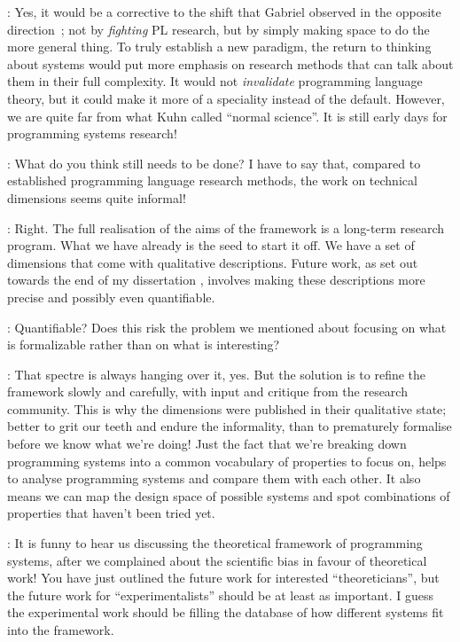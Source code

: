 \documentclass[runningheads]{llncs}
\newcommand{\T}{Tomas}
\newcommand{\J}{Joel}
\newcommand{\says}[2][gg]{\vspace{0.5em}\noindent\hangindent=0.5cm{\textsc{#1}}: #2}
\begin{document}
\says[\J]{Yes, it would be a corrective to the shift that Gabriel observed in the opposite direction\ \cite{rpg-2012-revolution}; not by \emph{fighting} PL research, but by simply making space to do the more general thing. To truly establish a new paradigm, the return to thinking about systems would put more emphasis on research methods that can talk about them in their full complexity. It would not \emph{invalidate} programming language theory, but it could make it more of a speciality instead of the default. However, we are quite far from what Kuhn called ``normal science''. It is still early days for programming systems research!}

\says[\T]{What do you think still needs to be done? I have to say that, compared to established programming language research methods, the work on technical dimensions seems quite informal!}

\says[\J]{Right. The full realisation of the aims of the framework is a long-term research program. What we have already is the seed to start it off. We have a set of dimensions that come with qualitative descriptions. Future work, as set out towards the end of my dissertation \cite{jakubovic-2024-phd}, involves making these descriptions more precise and possibly even quantifiable.}

\says[\T]{Quantifiable? Does this risk the problem we mentioned about focusing on what is formalizable rather than on what is interesting?}

\says[\J]{That spectre is always hanging over it, yes. But the solution is to refine the framework slowly and carefully, with input and critique from the research community. This is why the dimensions were published in their qualitative state; better to grit our teeth and endure the informality, than to prematurely formalise before we know what we're doing! Just the fact that we're breaking down programming systems into a common vocabulary of properties to focus on, helps to analyse programming systems and compare them with each other. It also means we can map the design space of possible systems and spot combinations of properties that haven't been tried yet.}

\says[\T]{It is funny to hear us discussing the theoretical framework of programming systems, after we complained about the scientific bias in favour of theoretical work! You have just outlined the future work for interested ``theoreticians'', but the future work for ``experimentalists'' should be at least as important. I guess the experimental work should be filling the database of how different systems fit into the framework.}
\end{document}
